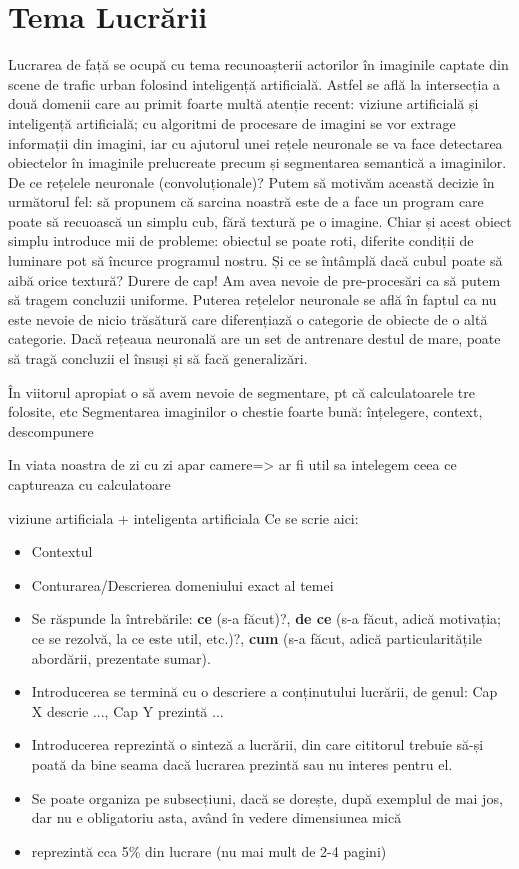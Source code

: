 \section {Tema Lucrării}
Lucrarea de față se ocupă cu tema recunoașterii actorilor în imaginile captate din scene de trafic urban folosind inteligență artificială. Astfel se află la intersecția a două domenii care au primit foarte multă atenție recent: viziune artificială și inteligență artificială; cu algoritmi de procesare de imagini se vor extrage informații din imagini, iar cu ajutorul unei rețele neuronale se va face detectarea obiectelor în imaginile prelucreate precum și segmentarea semantică a imaginilor.\newline
De ce rețelele neuronale (convoluționale)? Putem să motivăm această decizie în următorul fel: să propunem că sarcina noastră este de a face un program care poate să recuoască un simplu cub, fără textură pe o imagine. Chiar și acest obiect simplu introduce mii de probleme: obiectul se poate roti, diferite condiții de luminare pot să încurce programul nostru. Și ce se întâmplă dacă cubul poate să aibă orice textură? Durere de cap! Am avea nevoie de pre-procesări ca să putem să tragem concluzii uniforme.\newline
Puterea rețelelor neuronale se află în faptul ca nu este nevoie de nicio trăsătură care diferențiază o categorie de obiecte de o altă categorie. Dacă rețeaua neuronală are un set de antrenare destul de mare, poate să tragă concluzii el însuși și să facă generalizări.

În viitorul apropiat o să avem nevoie de segmentare, pt că calculatoarele tre folosite, etc
Segmentarea imaginilor o chestie foarte bună: înțelegere, context, descompunere

In viata noastra de zi cu zi apar camere=> ar fi util sa intelegem ceea ce captureaza cu calculatoare

viziune artificiala + inteligenta artificiala
Ce se scrie aici:
\begin{itemize}
    \item Contextul
    \item Conturarea/Descrierea domeniului exact al temei
    \item Se răspunde la întrebările: \textbf{ce} (s-a făcut)?, \textbf{de ce} (s-a făcut, adică motivația; ce se rezolvă, la ce este util, etc.)?, \textbf{cum} (s-a făcut, adică particularitățile abordării, prezentate sumar).
    \item Introducerea se termină cu o descriere a conținutului lucrării, de genul: Cap X descrie ..., Cap Y prezintă ...
    \item Introducerea reprezintă o sinteză a lucrării, din care cititorul trebuie să-și poată da bine seama dacă lucrarea prezintă sau nu interes pentru el. 
    \item Se poate organiza pe subsecțiuni, dacă se dorește, după exemplul de mai jos, dar nu e obligatoriu asta, având în vedere dimensiunea mică
    \item reprezintă cca 5\% din lucrare (nu mai mult de 2-4 pagini)
\end{itemize}

